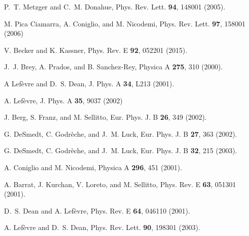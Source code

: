 \documentclass[prl,twocolumn,floats,floatfix,aps,superscriptaddress,showpacs]{revtex4-1}
\begin{document}
\begin{thebibliography}{99}
P.~T. Metzger and C.~M. Donahue, Phys. Rev. Lett. {\bf 94}, 148001 (2005).

M. Pica Ciamarra, A. Coniglio, and M. Nicodemi, Phys. Rev. Lett. {\bf 97}, 158001 (2006)

V. Becker and K. Kassner, Phys. Rev. E {\bf 92}, 052201 (2015).

J.~J. Brey, A. Prados, and B. Sanchez-Rey, Physica A {\bf 275}, 310 (2000).

A Lef\`evre and D.~S. Dean, J. Phys. A {\bf 34}, L213 (2001).

A. Lef\`evre, J. Phys. A {\bf 35}, 9037 (2002)

J. Berg, S. Franz, and M. Sellitto, Eur. Phys. J. B {\bf 26}, 349 (2002).

G. DeSmedt, C. Godr\`eche, and J.~M. Luck, Eur. Phys. J. B {\bf 27}, 363 (2002).

G. DeSmedt, C. Godr\`eche, and J.~M. Luck, Eur. Phys. J. B {\bf 32}, 215 (2003).

A. Coniglio and M. Nicodemi, Physica A {\bf 296}, 451 (2001).

A. Barrat, J. Kurchan, V. Loreto, and M. Sellitto, Phys. Rev. E {\bf 63}, 051301 (2001). 

D.~S. Dean and A. Lef\`evre, Phys. Rev. E {\bf 64}, 046110 (2001).

A. Lef\`evre and D.~S. Dean, Phys. Rev. Lett. {\bf 90}, 198301 (2003).


\end{thebibliography}
\end{document}
